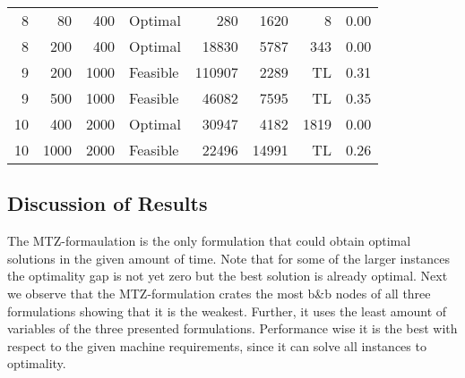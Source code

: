 \documentclass[11pt]{article}
\begin{document}
\begin{tabular}{rrrlrrrr}
        8 &    80 &          400 &         Optimal &        280 &      1620 &             8 &                0.00 \\
        8 &   200 &          400 &         Optimal &      18830 &      5787 &           343 &                0.00 \\
        9 &   200 &         1000 &        Feasible &     110907 &      2289 &          TL &                0.31 \\
        9 &   500 &         1000 &        Feasible &      46082 &      7595 &          TL &                0.35 \\
       10 &   400 &         2000 &         Optimal &      30947 &      4182 &          1819 &                0.00 \\
       10 &  1000 &         2000 &        Feasible &      22496 &     14991 &          TL &                0.26 \\
\bottomrule
\end{tabular}
\subsection{Discussion of Results}
The MTZ-formaulation is the only formulation that could obtain optimal solutions in the given amount of time. Note that for some of the larger instances the optimality gap is not yet zero but the best solution is already optimal. Next we observe that the MTZ-formulation crates the most b\&b nodes of all three formulations showing that it is the weakest. Further, it uses the least amount of variables of the three presented formulations. Performance wise it is the best with respect to the given machine requirements, since it can solve all instances to optimality.
%
\newpage
 

\end{document}
